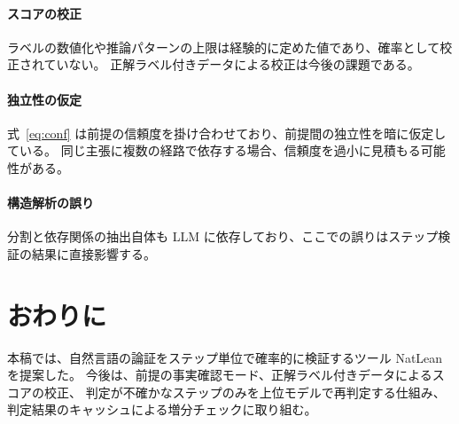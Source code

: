\documentclass[a4paper,11pt]{ltjsarticle}
\begin{document}
\paragraph{スコアの校正}
ラベルの数値化や推論パターンの上限は経験的に定めた値であり、確率として校正されていない。
正解ラベル付きデータによる校正は今後の課題である。

\paragraph{独立性の仮定}
式~\eqref{eq:conf} は前提の信頼度を掛け合わせており、前提間の独立性を暗に仮定している。
同じ主張に複数の経路で依存する場合、信頼度を過小に見積もる可能性がある。

\paragraph{構造解析の誤り}
分割と依存関係の抽出自体も LLM に依存しており、ここでの誤りはステップ検証の結果に直接影響する。

\section{おわりに}

本稿では、自然言語の論証をステップ単位で確率的に検証するツール NatLean を提案した。
今後は、前提の事実確認モード、正解ラベル付きデータによるスコアの校正、
判定が不確かなステップのみを上位モデルで再判定する仕組み、
判定結果のキャッシュによる増分チェックに取り組む。



\end{document}
